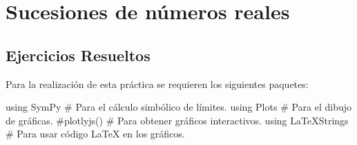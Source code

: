 \documentclass[
  a4paper,
]{scrreport}
\newenvironment{Shaded}{\begin{snugshade}}{\end{snugshade}}
\newcommand{\BuiltInTok}[1]{\textcolor[rgb]{0.00,0.23,0.31}{#1}}
\newcommand{\CommentTok}[1]{\textcolor[rgb]{0.37,0.37,0.37}{#1}}
\newcommand{\ImportTok}[1]{\textcolor[rgb]{0.00,0.46,0.62}{#1}}
\theoremstyle{definition}
\theoremstyle{remark}
\begin{document}

\hypertarget{sucesiones-de-nuxfameros-reales}{%
\chapter{Sucesiones de números
reales}\label{sucesiones-de-nuxfameros-reales}}

\hypertarget{ejercicios-resueltos}{%
\section{Ejercicios Resueltos}\label{ejercicios-resueltos}}

Para la realización de esta práctica se requieren los siguientes
paquetes:

\begin{Shaded}
\begin{Highlighting}[]
\ImportTok{using} \BuiltInTok{SymPy  }\CommentTok{\# Para el cálculo simbólico de límites.}
\ImportTok{using} \BuiltInTok{Plots  }\CommentTok{\# Para el dibujo de gráficas.}
\CommentTok{\#plotlyjs() \# Para obtener gráficos interactivos.}
\ImportTok{using} \BuiltInTok{LaTeXStrings  }\CommentTok{\# Para usar código LaTeX en los gráficos.}
\end{Highlighting}
\end{Shaded}
\end{document}
